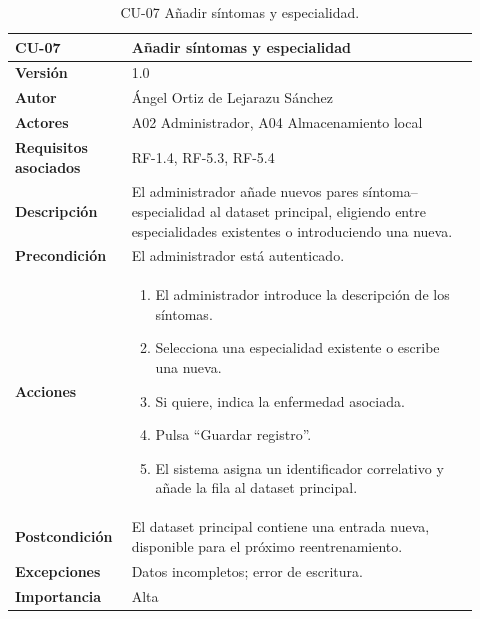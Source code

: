 \begin{table}[H]
	\centering
	\begin{tabular}{ p{0.21\linewidth} p{0.71\linewidth} }
		\toprule
		\textbf{CU-07}    & \textbf{Añadir síntomas y especialidad}\\
		\toprule
		\textbf{Versión}              & 1.0 \\
		\textbf{Autor}                & Ángel Ortiz de Lejarazu Sánchez \\
		\textbf{Actores}              & A02 Administrador, A04 Almacenamiento local \\
		\textbf{Requisitos asociados} & RF-1.4, RF-5.3, RF-5.4 \\
		\textbf{Descripción}          & El administrador añade nuevos pares síntoma--especialidad al dataset principal, eligiendo entre especialidades existentes o introduciendo una nueva. \\
		\textbf{Precondición}         & El administrador está autenticado. \\
		\textbf{Acciones}             &
		\begin{enumerate}
			\def\labelenumi{\arabic{enumi}.}
			\item El administrador introduce la descripción de los síntomas.
			\item Selecciona una especialidad existente o escribe una nueva.
			\item Si quiere, indica la enfermedad asociada.
			\item Pulsa ``Guardar registro''.
			\item El sistema asigna un identificador correlativo y añade la fila al dataset principal.
		\end{enumerate} \\
		\textbf{Postcondición}        & El dataset principal contiene una entrada nueva, disponible para el próximo reentrenamiento. \\
		\textbf{Excepciones}          & Datos incompletos; error de escritura. \\
		\textbf{Importancia}          & Alta \\
		\bottomrule
	\end{tabular}
	\caption{CU-07 Añadir síntomas y especialidad.}
\end{table}

